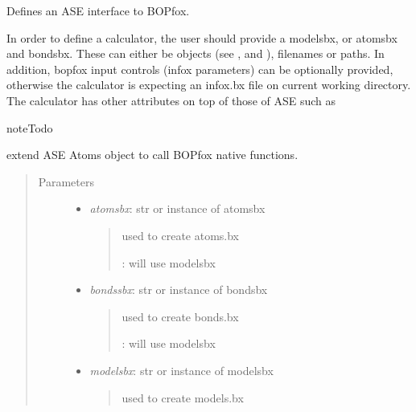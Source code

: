 \documentclass[letterpaper,10pt,english]{sphinxmanual}
\begin{document}
\begin{fulllineitems}
\label{classes:bopcal.BOPfox}
Defines an ASE interface to BOPfox.

In order to define a calculator, the user should provide a modelsbx,
or atomsbx and bondsbx. These can either be objects (see ,
 and ), filenames or paths. In addition, bopfox
input controls (infox parameters) can be optionally provided, otherwise the
calculator is expecting an infox.bx file on current working directory. 
The calculator has other attributes on top
of those of ASE such as {\hyperref[classes:bopcal.BOPfox.get_moments]{}}

\begin{notice}{note}{Todo}

extend ASE Atoms object to call BOPfox native functions.
\end{notice}
\begin{quote}\begin{description}
\item[{Parameters}] \leavevmode\begin{itemize}
\item {} 
\emph{atomsbx}: str or instance of atomsbx
\begin{quote}

used to create atoms.bx

: will use modelsbx
\end{quote}

\item {} 
\emph{bondssbx}: str or instance of bondsbx
\begin{quote}

used to create bonds.bx

: will use modelsbx
\end{quote}

\item {} 
\emph{modelsbx}: str or instance of modelsbx
\begin{quote}

used to create models.bx


\end{quote}
\end{itemize}
\end{description}
\end{quote}
\end{fulllineitems}
\end{document}
